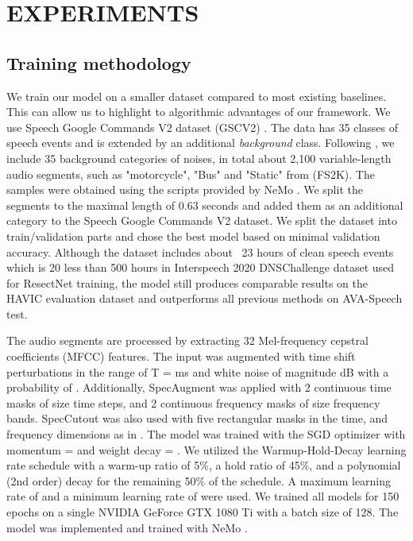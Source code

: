 \documentclass{article}
\begin{document}
\section{EXPERIMENTS}
\label{sec:exps}

\subsection{Training methodology}
We train our model on a smaller dataset compared to most existing baselines. This can allow us to highlight to algorithmic advantages of our framework. We use Speech Google Commands V2 dataset (GSCV2) \cite{warden2018speech}. The data has 35 classes of speech events and is extended by an additional \textit{background} class. Following \cite{jia2021marblenet}, we include 35 background categories of noises, in total about 2,100 variable-length audio segments, such as "motorcycle", "Bus" and "Static" from \cite{font2013freesound} (FS2K). The samples were obtained using the scripts provided by NeMo \cite{kuchaiev2019nemo}. We split the segments to the maximal length of 0.63 seconds and added them as an additional category to the Speech Google Commands V2 dataset. 
We split the dataset into train/validation parts and chose the best model based on minimal validation accuracy.
Although the dataset includes about ~23 hours of clean speech events which is 20 less than 500 hours in Interspeech 2020 DNSChallenge dataset \cite{reddy2020interspeech} used for ResectNet \cite{kopuklu2022resectnet} training, the model still produces comparable results on the HAVIC evaluation dataset and outperforms all previous methods on AVA-Speech test.

The audio segments are processed by extracting 32 Mel-frequency cepstral coefficients (MFCC) features. The input was augmented with time shift perturbations in the range of T =  ms and white noise of magnitude  dB with a probability of . Additionally, SpecAugment \cite{park2019specaugment} was applied with 2 continuous time masks of size  time steps, and 2 continuous frequency masks of size 
frequency bands. SpecCutout \cite{devries2017improved} was also used with five rectangular masks in the time, and frequency dimensions as in \cite{jia2021marblenet}. The model was trained with the SGD optimizer with momentum =  and weight decay = . We utilized the Warmup-Hold-Decay learning rate schedule \cite{he2019bag} with a warm-up ratio of 5\%, a hold ratio of 45\%, and a polynomial (2nd order) decay for the remaining 50\% of the schedule. A maximum 
learning rate of  and a minimum learning rate of  were used. We trained all models for 150 epochs on a single NVIDIA GeForce GTX 1080 Ti with a batch size of 128. The model was implemented and trained with NeMo \cite{kuchaiev2019nemo}. 
\end{document}

